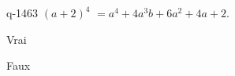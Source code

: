 \begin{truefalse}{q-1463}
$(a+2)^4$ $=a^4+4a^3b+6a^2+4a+2$.
\item Vrai
\item* Faux
\end{truefalse}

